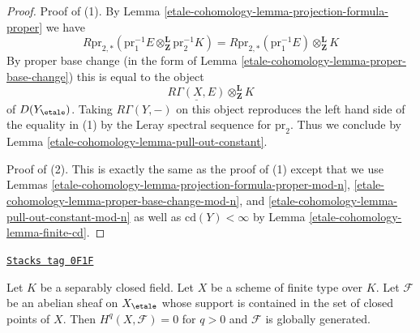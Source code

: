 \begin{proof}
Proof of (1). By Lemma \ref{etale-cohomology-lemma-projection-formula-proper} we have
$$
R\text{pr}_{2, *}(
\text{pr}_1^{-1}E
\otimes_\mathbf{Z}^\mathbf{L}
\text{pr}_2^{-1}K) =
R\text{pr}_{2, *}(\text{pr}_1^{-1}E)
\otimes_\mathbf{Z}^\mathbf{L}
K
$$
By proper base change (in the form of Lemma \ref{etale-cohomology-lemma-proper-base-change})
this is equal to the object
$$
\underline{R\Gamma(X, E)}
\otimes_\mathbf{Z}^\mathbf{L}
K
$$
of $D(Y_\etale)$. Taking $R\Gamma(Y, -)$ on this object reproduces the
left hand side of the equality in (1) by the Leray spectral sequence
for $\text{pr}_2$. Thus we conclude by
Lemma \ref{etale-cohomology-lemma-pull-out-constant}.

\medskip\noindent
Proof of (2). This is exactly the same as the proof of (1)
except that we use Lemmas \ref{etale-cohomology-lemma-projection-formula-proper-mod-n},
\ref{etale-cohomology-lemma-proper-base-change-mod-n}, and
\ref{etale-cohomology-lemma-pull-out-constant-mod-n} as well as
$\text{cd}(Y) < \infty$ by Lemma \ref{etale-cohomology-lemma-finite-cd}.
\end{proof}

\begin{lemma}
\label{etale-cohomology-lemma-supported-in-closed-points}
\href{https://stacks.math.columbia.edu/tag/0F1F}{\texttt{Stacks tag 0F1F}}

Let $K$ be a separably closed field. Let $X$ be a scheme of finite
type over $K$. Let $\mathcal{F}$ be an abelian sheaf on $X_\etale$
whose support is contained in the set of closed points of $X$.
Then $H^q(X, \mathcal{F}) = 0$ for $q > 0$ and $\mathcal{F}$
is globally generated.
\end{lemma}

